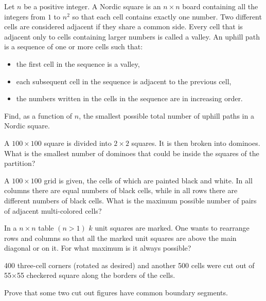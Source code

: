 \begin{problem}[ISL 2022]
    Let $n$ be a positive integer. A Nordic square is an $n \times n$ board containing all the integers from $1$ to $n^2$ so that each cell contains exactly one number. Two different cells are considered adjacent if they share a common side. Every cell that is adjacent only to cells containing larger numbers is called a valley. An uphill path is a sequence of one or more cells such that:
    \begin{itemize}
        \item the first cell in the sequence is a valley,
        \item each subsequent cell in the sequence is adjacent to the previous cell,
        \item the numbers written in the cells in the sequence are in increasing order.
    \end{itemize}
    Find, as a function of $n$, the smallest possible total number of uphill paths in a Nordic square.
\end{problem}

\begin{problem}
    A $100\times 100$ square is divided into $2\times 2$ squares. It is then broken into dominoes. What is the smallest number of dominoes that could be inside the squares of the partition?
\end{problem}

\begin{problem}
    A $100\times 100$ grid is given, the cells of which are painted black and white. In all columns there are equal numbers of black cells, while in all rows there are different numbers of black cells. What is the maximum possible number of pairs of adjacent multi-colored cells?
\end{problem}

\begin{problem}[Tuymaada 2021]
    In a $n\times n$ table $(n>1)$ $k$ unit squares are marked. One wants to rearrange rows and columns so that all the marked unit squares are above the main diagonal or on it. For what maximum  is it always possible?
\end{problem}

\begin{problem}
    400 three-cell corners (rotated as desired) and another 500 cells were cut out of 55×55 checkered square along the borders of the cells.
    
    Prove that some two cut out figures have common boundary segments.
\end{problem}

